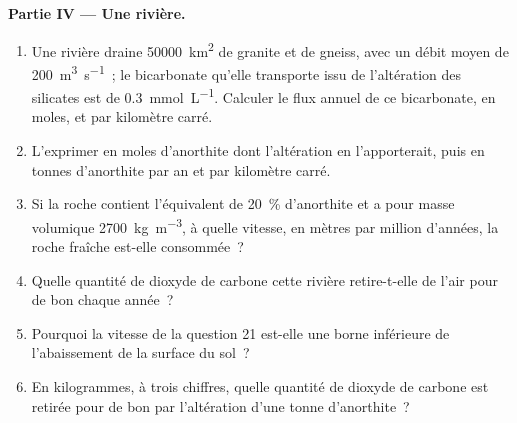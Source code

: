 \begin{problem}
\medskip
\noindent\textbf{Partie IV --- Une rivière.}
\begin{enumerate}[resume]
  \item Une rivière draine \qty{50000}{km^2} de granite et de gneiss, avec un débit
        moyen de \qty{200}{m^3.s^{-1}}~; le bicarbonate qu'elle transporte issu de
        l'altération des silicates est de \qty{0.3}{mmol.L^{-1}}. Calculer le flux annuel
        de ce bicarbonate, en moles, et par kilomètre carré.
  \item L'exprimer en moles d'anorthite dont l'altération en 
        l'apporterait, puis en tonnes d'anorthite par an et par kilomètre
        carré.
  \item Si la roche contient l'équivalent de \qty{20}{\percent}
        d'anorthite et a pour masse volumique \qty{2700}{kg.m^{-3}}, à quelle vitesse, en
        mètres par million d'années, la roche fraîche est-elle consommée~?
  \item Quelle quantité de dioxyde de carbone cette rivière retire-t-elle de l'air pour de bon
        chaque année~?
  \item Pourquoi la vitesse de la question 21 est-elle une borne inférieure de l'abaissement de
        la surface du sol~?
  \item En kilogrammes, à trois chiffres, quelle quantité de dioxyde de carbone est retirée
        pour de bon par l'altération d'une tonne d'anorthite~?
\end{enumerate}
\end{problem}
